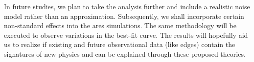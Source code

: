 \documentclass[12pt, TexShade, letterpaper]{report}
\begin{document}
In future studies, we plan to take the analysis further and include a realistic noise model rather than an approximation. Subsequently, we shall incorporate certain non-standard effects into the \gls{ares} simulations. The same methodology will be executed to observe variations in the best-fit curve. 
The results will hopefully aid us to realize if existing and future observational data (like \gls{edges}) contain the signatures of new physics and can be explained through these proposed theories.\par

	{
	
	
	
	
	}
\end{document}
